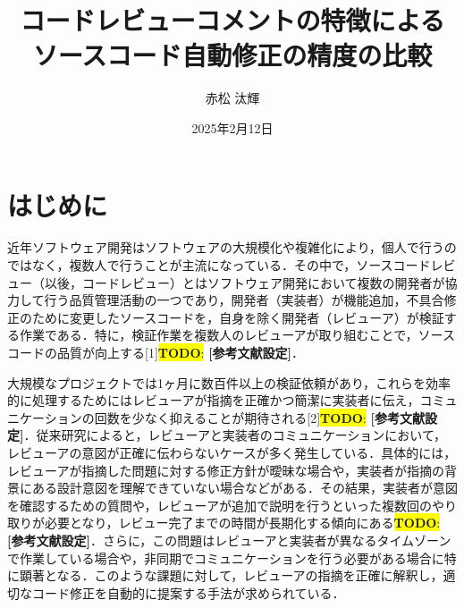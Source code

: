 \documentclass[11pt]{jreport}
\title{コードレビューコメントの特徴による\\ソースコード自動修正の精度の比較}
\author{赤松 汰輝}
\date{2025年2月12日}	%
\newcommand{\todo}[1]{\colorbox{yellow}{{\bf TODO}:}{\color{red} {\textbf{[#1]}}}}
\begin{document}
\maketitle

\begin{abstract}

\end{abstract}

\tableofcontents



\newpage
{}	%



\chapter{はじめに}
近年ソフトウェア開発はソフトウェアの大規模化や複雑化により，個人で行うのではなく，複数人で行うことが主流になっている．その中で，ソースコードレビュー（以後，コードレビュー）とはソフトウェア開発において複数の開発者が協力して行う品質管理活動の一つであり，開発者（実装者）が機能追加，不具合修正のために変更したソースコードを，自身を除く開発者（レビューア）が検証する作業である．特に，検証作業を複数人のレビューアが取り組むことで，ソースコードの品質が向上する[1]\todo{参考文献設定}．

大規模なプロジェクトでは1ヶ月に数百件以上の検証依頼があり，これらを効率的に処理するためにはレビューアが指摘を正確かつ簡潔に実装者に伝え，コミュニケーションの回数を少なく抑えることが期待される[2]\todo{参考文献設定}．従来研究によると，レビューアと実装者のコミュニケーションにおいて，レビューアの意図が正確に伝わらないケースが多く発生している．具体的には，レビューアが指摘した問題に対する修正方針が曖昧な場合や，実装者が指摘の背景にある設計意図を理解できていない場合などがある．その結果，実装者が意図を確認するための質問や，レビューアが追加で説明を行うといった複数回のやり取りが必要となり，レビュー完了までの時間が長期化する傾向にある\todo{参考文献設定}．さらに，この問題はレビューアと実装者が異なるタイムゾーンで作業している場合や，非同期でコミュニケーションを行う必要がある場合に特に顕著となる．このような課題に対して，レビューアの指摘を正確に解釈し，適切なコード修正を自動的に提案する手法が求められている．
\end{document}
